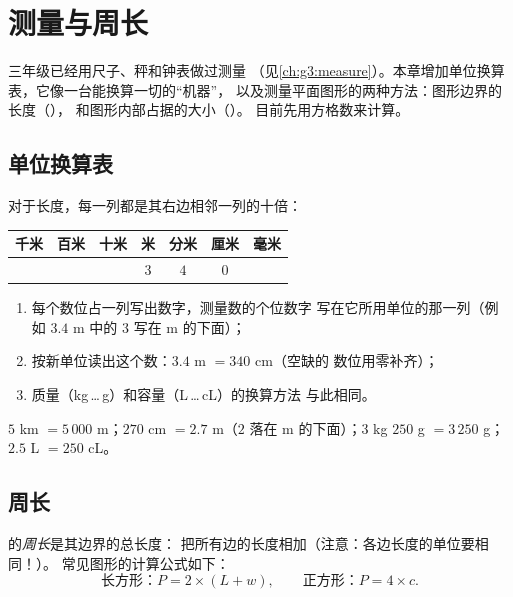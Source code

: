 \chapter{测量与周长}\label{ch:g4:measure}

三年级已经用尺子、秤和钟表做过测量
（见\cref{ch:g3:measure}）。本章增加单位换算表，它像一台能换算一切的“机器”，
以及测量平面图形的两种方法：图形边界的长度（），
和图形内部占据的大小（）。
目前先用方格数来计算。

\section{单位换算表}

\begin{method}[用换算表进行换算]\label{met:g4:measure:table}
对于长度，每一列都是其右边相邻一列的十倍：
\begin{center}
\renewcommand{\arraystretch}{1.3}
\begin{tabular}{c|c|c|c|c|c|c}
千米 & 百米 & 十米 & 米 & 分米 & 厘米 & 毫米 \\
\hline
 & & & $3$ & $4$ & $0$ & \\
\end{tabular}
\end{center}
\begin{enumerate}
  \item 每个数位占一列写出数字，测量数的个位数字
        写在它所用单位的那一列（例如 $3.4$ m 中的 $3$
        写在 m 的下面）；
  \item 按新单位读出这个数：$3.4$ m $= 340$ cm（空缺的
        数位用零补齐）；
  \item 质量（kg\,\dots\,g）和容量（L\,\dots\,cL）的换算方法
        与此相同。
\end{enumerate}
\end{method}

\begin{example}\label{ex:g4:measure:convert}
$5$ km $= 5\,000$ m；\quad $270$ cm $= 2.7$ m（$2$ 落在
m 的下面）；\quad $3$ kg $250$ g $= 3\,250$ g；\quad
$2.5$ L $= 250$ cL。
\end{example}

\section{周长}

\begin{definition}[周长]\label{def:g4:measure:perimeter}
的\emph{周长}是其边界的总长度：
把所有边的长度相加（注意：各边长度的单位要相同！）。
常见图形的计算公式如下：
\[
\text{长方形：} P = 2 \times (L + w),
\qquad
\text{正方形：} P = 4 \times c .
\]
\end{definition}

